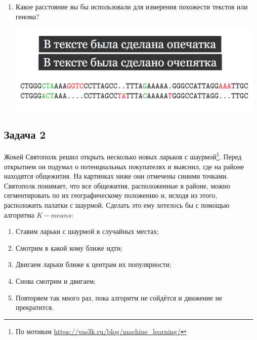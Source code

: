 \documentclass[12pt, a4paper, oneside]{article}
\begin{document}
\begin{enumerate}
\item Какое расстояние вы бы использовали для измерения похожести текстов или генома?

\begin{center}
	\includegraphics[scale=0.3]{metr_3.png}
\end{center}


\end{enumerate}


\subsection*{Задача 2}

Жокей Святополк решил открыть несколько новых ларьков с шаурмой\footnote{По мотивам \url{https://vas3k.ru/blog/machine_learning/}}. Перед открытием он подумал о потенциальных покупателях и выяснил, где на районе находятся общежития.  На картинках ниже они отмечены синими точками.  Святополк понимает, что все общежития, расположенные в районе, можно сегментировать по их географическому положению и, исходя из этого, расположить палатки с шаурмой. Сделать  это ему хотелось бы с помощью алгоритма $K-means$:

\begin{enumerate}
	\item Ставим ларьки с шаурмой в случайных местах;
	\item Смотрим в какой кому ближе идти;
	\item Двигаем ларьки ближе к центрам их популярности;
	\item Снова смотрим и двигаем;
	\item Повторяем так много раз, пока алгоритм не сойдётся и движение не прекратится.
\end{enumerate}
\end{document}
